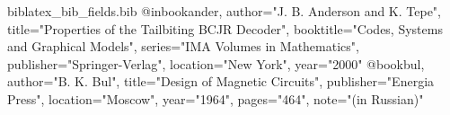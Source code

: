 \begin{filecontents*}[overwrite]{biblatex_bib_fields.bib}
@inbook{ander, author="J. B. Anderson and K. Tepe",
  title="Properties of the Tailbiting BCJR Decoder",
  booktitle="Codes, Systems and Graphical Models",
  series="IMA Volumes in Mathematics", publisher="Springer-Verlag",
  location="New York", year="2000"}
@book{bul, author="B. K. Bul", title="Design of Magnetic Circuits",
  publisher="Energia Press", location="Moscow", year="1964",
  pages="464", note="(in Russian)"}
\end{filecontents*}
\documentclass{article}
\usepackage[style=ieee,backend=biber]{biblatex}


Hello \cite{ander} \cite{bul}.
\printbibliography

